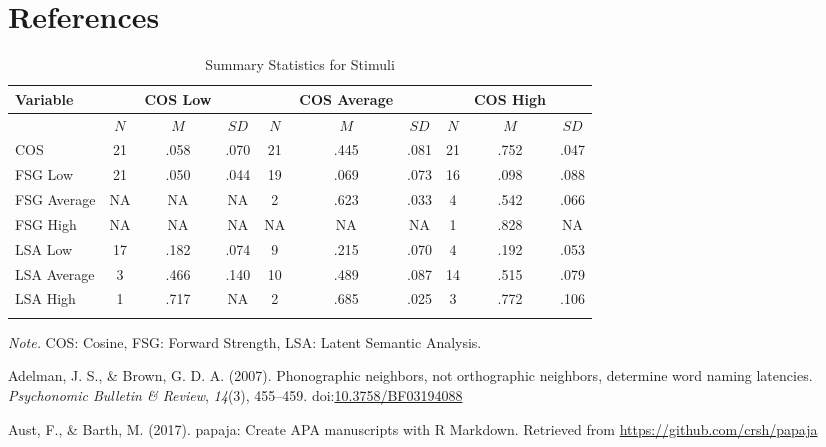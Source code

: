 \documentclass[english,man]{apa6}
\theoremstyle{definition}
\theoremstyle{definition}
\theoremstyle{definition}
\theoremstyle{remark}
\begin{document}
\newpage

\section{References}\label{references}

\setlength{\parindent}{-0.5in} \setlength{\leftskip}{0.5in}

\begin{table}[tbp]
\begin{center}
\begin{threeparttable}
\caption{\label{tab:unnamed-chunk-1}Summary Statistics for Stimuli}
\begin{tabular}{lccccccccc}
\toprule
Variable &   & COS Low &   &   & COS Average &   &   & COS High &  \\
\midrule
 & $N$ & $M$ & $SD$ & $N$ & $M$ & $SD$ & $N$ & $M$ & $SD$\\
COS & 21 & .058 & .070 & 21 & .445 & .081 & 21 & .752 & .047\\
FSG Low & 21 & .050 & .044 & 19 & .069 & .073 & 16 & .098 & .088\\
FSG Average & NA & NA & NA & 2 & .623 & .033 & 4 & .542 & .066\\
FSG High & NA & NA & NA & NA & NA & NA & 1 & .828 & NA\\
LSA Low & 17 & .182 & .074 & 9 & .215 & .070 & 4 & .192 & .053\\
LSA Average & 3 & .466 & .140 & 10 & .489 & .087 & 14 & .515 & .079\\
LSA High & 1 & .717 & NA & 2 & .685 & .025 & 3 & .772 & .106\\
\bottomrule
\addlinespace
\end{tabular}
\begin{tablenotes}[para]
\textit{Note.} COS: Cosine, FSG: Forward Strength, LSA: Latent Semantic Analysis.
\end{tablenotes}
\end{threeparttable}
\end{center}
\end{table}

\hypertarget{refs}{}
\hypertarget{ref-Adelman2007}{}
Adelman, J. S., \& Brown, G. D. A. (2007). Phonographic neighbors, not
orthographic neighbors, determine word naming latencies.
\emph{Psychonomic Bulletin \& Review}, \emph{14}(3), 455--459.
doi:\href{https://doi.org/10.3758/BF03194088}{10.3758/BF03194088}

\hypertarget{ref-Aust2017}{}
Aust, F., \& Barth, M. (2017). papaja: Create APA manuscripts with R
Markdown. Retrieved from \url{https://github.com/crsh/papaja}
\end{document}
